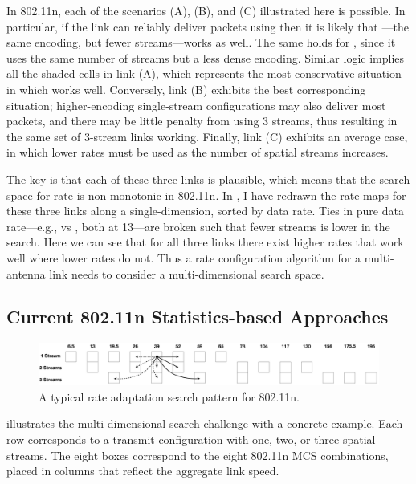 In 802.11n, each of the scenarios (A), (B), and (C) illustrated here is possible. In particular, if the link can reliably deliver packets using  then it is likely that ---the same encoding, but fewer streams---works as well. The same holds for , since it uses the same number of streams but a less dense encoding. Similar logic implies all the shaded cells in link (A), which represents the most conservative situation in which  works well. Conversely, link (B) exhibits the best corresponding situation; higher-encoding single-stream configurations may also deliver most packets, and there may be little penalty from using 3 streams, thus resulting in the same set of 3-stream links working. Finally, link (C) exhibits an average case, in which lower rates must be used as the number of spatial streams increases.

The key is that each of these three links is plausible, which means that the search space for rate is non-monotonic in 802.11n. In , I have redrawn the rate maps for these three links along a single-dimension, sorted by data rate. Ties in pure data rate---e.g.,  vs , both at 13\Mbps---are broken such that fewer streams is lower in the search. Here we can see that for all three links there exist higher rates that work well where lower rates do not. Thus a rate configuration algorithm for a multi-antenna link needs to consider a multi-dimensional search space.

\subsection{Current 802.11n Statistics-based Approaches}
\begin{figure}[t]
      \centering
      \includegraphics[scale=0.33]{figures/approach_figs/search_11n.pdf}
      \caption[Rate adaptation search pattern for 802.11n]{\label{fig:search_11n}A typical rate adaptation search pattern for 802.11n.}
\end{figure}
 illustrates the multi-dimensional search challenge with a concrete example. Each row corresponds to a transmit configuration with one, two, or three spatial streams. The eight boxes correspond to the eight 802.11n MCS combinations, placed in columns that reflect the aggregate link speed.

